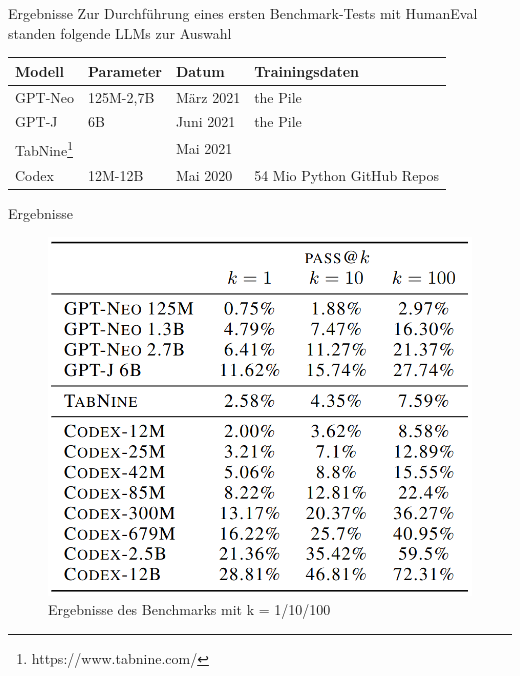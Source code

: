 \documentclass{beamer}              %
\begin{document}
\begin{frame}{Ergebnisse}
Zur Durchführung eines ersten Benchmark-Tests mit HumanEval standen folgende LLMs zur Auswahl
\begin{table}[]
\begin{tabular}{|l|l|l|l|}
\hline
\textbf{Modell} & \textbf{Parameter} & \textbf{Datum} & \textbf{Trainingsdaten} \\ \hline
GPT-Neo\cite{black2021gptneo} & 125M-2,7B & März 2021 & the Pile\cite{gao2020pile}  \\ \hline
GPT-J\cite{wang2021gptj} & 6B & Juni 2021 & the Pile  \\ \hline
TabNine\footnote{https://www.tabnine.com/} &  & Mai 2021 & \\ \hline
Codex & 12M-12B & Mai 2020 & 54 Mio Python GitHub Repos \\ \hline
\end{tabular}
\end{table}
\end{frame}

\begin{frame}{Ergebnisse}
    \begin{figure}
        \centering
        \includegraphics[width=0.55\paperwidth]{images/humanevaleval.png}
        \caption{Ergebnisse des Benchmarks mit k = 1/10/100\cite{chen2021evaluating}}
    \end{figure}
\end{frame}
\end{document}
